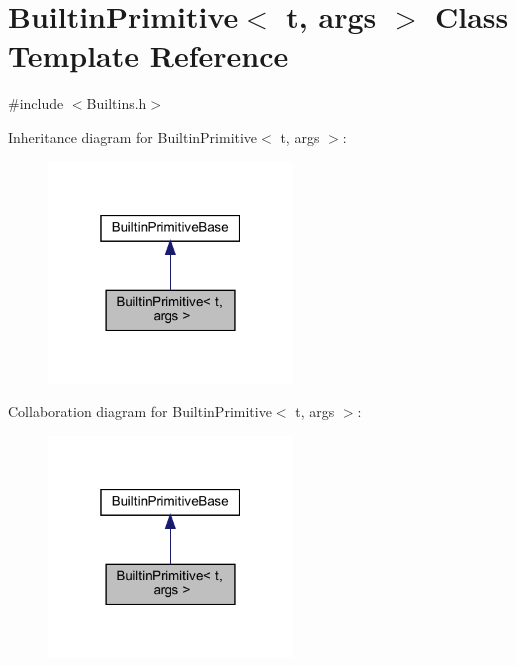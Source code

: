 \hypertarget{struct_builtin_primitive}{}\section{Builtin\+Primitive$<$ t, args $>$ Class Template Reference}
\label{struct_builtin_primitive}


{\ttfamily \#include $<$Builtins.\+h$>$}



Inheritance diagram for Builtin\+Primitive$<$ t, args $>$\+:\nopagebreak
\begin{figure}[H]
\begin{center}
\leavevmode
\includegraphics[width=184pt]{struct_builtin_primitive__inherit__graph}
\end{center}
\end{figure}


Collaboration diagram for Builtin\+Primitive$<$ t, args $>$\+:\nopagebreak
\begin{figure}[H]
\begin{center}
\leavevmode
\includegraphics[width=184pt]{struct_builtin_primitive__coll__graph}
\end{center}
\end{figure}

